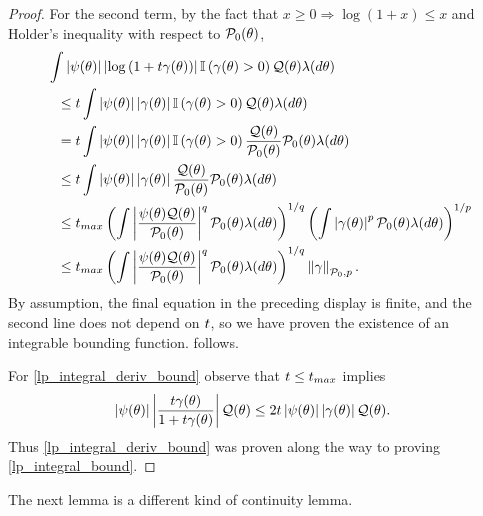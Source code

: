 \begin{lem}
\begin{proof}
For the second term, by the fact that $x \ge 0 \Rightarrow \log (1 + x) \le x$
and Holder's inequality with respect to $\mathcal{P}_{0}(\theta)$,
%
\begin{align*}
%
\MoveEqLeft
\int \abs{\psi(\theta)}
    \abs{\log\left(1 + \t \gamma(\theta)\right)}
    \ind{\gamma(\theta) > 0}
    \q(\theta)\lambda(d\theta)
\\\le{}&
\t
\int \abs{\psi(\theta)}
    \abs{\gamma(\theta)}
    \ind{\gamma(\theta) > 0}
    \q(\theta)\lambda(d\theta)
\\={}&
\t
\int \abs{\psi(\theta)}
    \abs{\gamma(\theta)}
    \ind{\gamma(\theta) > 0}
    \frac{\q(\theta)}{\pbase(\theta)} \pbase(\theta) \lambda(d\theta)
\\\le{}&
\t
\int \abs{\psi(\theta)}
    \abs{\gamma(\theta)}
    \frac{\q(\theta)}{\pbase(\theta)} \pbase(\theta) \lambda(d\theta)
\\\le{}&
\t_{max}
\left(
\int
    \abs{\frac{\psi(\theta)\q(\theta)}{\pbase(\theta)}}^q
    \pbase(\theta) \lambda(d\theta)
\right)^{1/q}
\left(
\int\abs{\gamma(\theta)}^p \pbase(\theta) \lambda(d\theta)
\right)^{1/p}
\\\le{}&
\t_{max}
\left(
\int
    \abs{\frac{\psi(\theta)\q(\theta)}{\pbase(\theta)}}^q
    \pbase(\theta) \lambda(d\theta)
\right)^{1/q}
\norm{\gamma}_{\pbase,p}.
%
\end{align*}
%
By assumption, the final equation in the preceding display is finite, and the
second line does not depend on $t$, so we have proven the existence of an
integrable bounding function.   follows.

For \eqref{lp_integral_deriv_bound} observe that $t \le t_{max}$ implies
%
\begin{align*}
%
\abs{\psi(\theta)}
    \abs{\frac{\t \gamma(\theta)}{1 + \t \gamma(\theta)}} \q(\theta)
\le{}&
2 \t \abs{\psi(\theta)} \abs{\gamma(\theta)} \q(\theta).
%
\end{align*}
%
Thus \eqref{lp_integral_deriv_bound} was proven along the way to
proving \eqref{lp_integral_bound}.
%
\end{proof}
%
\end{lem}




The next lemma is a different kind of continuity lemma.


